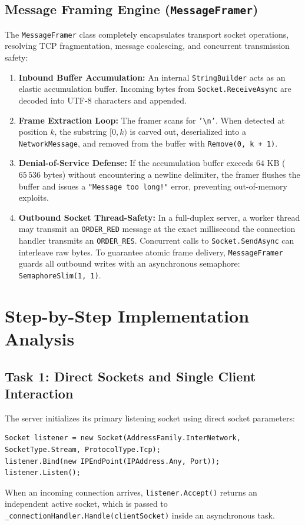 \documentclass[12pt,a4paper]{article}
\begin{document}
\subsection{Message Framing Engine (\texttt{MessageFramer})}
The \texttt{MessageFramer} class completely encapsulates transport socket operations, resolving TCP fragmentation, message coalescing, and concurrent transmission safety:
\begin{enumerate}
    \item \textbf{Inbound Buffer Accumulation:} An internal \texttt{StringBuilder} acts as an elastic accumulation buffer. Incoming bytes from \texttt{Socket.ReceiveAsync} are decoded into UTF-8 characters and appended.
    \item \textbf{Frame Extraction Loop:} The framer scans for \texttt{'\textbackslash n'}. When detected at position $k$, the substring $[0, k)$ is carved out, deserialized into a \texttt{NetworkMessage}, and removed from the buffer with \texttt{Remove(0, k + 1)}.
    \item \textbf{Denial-of-Service Defense:} If the accumulation buffer exceeds $64\text{ KB}$ ($65\,536$ bytes) without encountering a newline delimiter, the framer flushes the buffer and issues a \texttt{"Message too long!"} error, preventing out-of-memory exploits.
    \item \textbf{Outbound Socket Thread-Safety:} In a full-duplex server, a worker thread may transmit an \texttt{ORDER\_RED} message at the exact millisecond the connection handler transmits an \texttt{ORDER\_RES}. Concurrent calls to \texttt{Socket.SendAsync} can interleave raw bytes. To guarantee atomic frame delivery, \texttt{MessageFramer} guards all outbound writes with an asynchronous semaphore: \texttt{SemaphoreSlim(1, 1)}.
\end{enumerate}

\section{Step-by-Step Implementation Analysis}

\subsection{Task 1: Direct Sockets and Single Client Interaction}
The server initializes its primary listening socket using direct socket parameters:
\begin{lstlisting}
Socket listener = new Socket(AddressFamily.InterNetwork, SocketType.Stream, ProtocolType.Tcp);
listener.Bind(new IPEndPoint(IPAddress.Any, Port));
listener.Listen();
\end{lstlisting}
When an incoming connection arrives, \texttt{listener.Accept()} returns an independent active socket, which is passed to \texttt{\_connectionHandler.Handle(clientSocket)} inside an asynchronous task.
\end{document}
